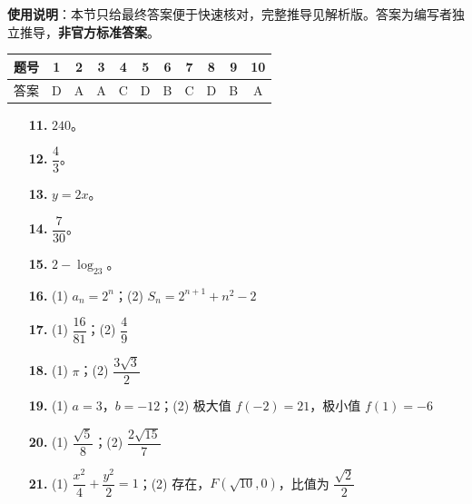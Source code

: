 
\begin{gknotice}
\textbf{使用说明}：本节只给最终答案便于快速核对，完整推导见解析版。答案为编写者独立推导，\textbf{非官方标准答案}。
\end{gknotice}

\begin{center}\begin{tabular}{ccccccccccc}
\toprule
题号 & 1 & 2 & 3 & 4 & 5 & 6 & 7 & 8 & 9 & 10 \\
\midrule
答案 & D & A & A & C & D & B & C & D & B & A \\
\bottomrule
\end{tabular}\end{center}

\begin{itemize}[leftmargin=2.6em]
  \item[\textbf{11.}] $240$。
  \item[\textbf{12.}] $\dfrac43$。
  \item[\textbf{13.}] $y=2x$。
  \item[\textbf{14.}] $\dfrac7{30}$。
  \item[\textbf{15.}] $2-\log_23$。
\end{itemize}

\begin{itemize}[leftmargin=2.6em]
  \item[\textbf{16.}] (1) $a_n=2^n$；(2) $S_n=2^{n+1}+n^2-2$
  \item[\textbf{17.}] (1) $\dfrac{16}{81}$；(2) $\dfrac49$
  \item[\textbf{18.}] (1) $\pi$；(2) $\dfrac{3\sqrt3}2$
  \item[\textbf{19.}] (1) $a=3$，$b=-12$；(2) 极大值 $f(-2)=21$，极小值 $f(1)=-6$
  \item[\textbf{20.}] (1) $\dfrac{\sqrt5}8$；(2) $\dfrac{2\sqrt{15}}7$
  \item[\textbf{21.}] (1) $\dfrac{x^2}4+\dfrac{y^2}2=1$；(2) 存在，$F(\sqrt{10},0)$，比值为 $\dfrac{\sqrt2}2$
\end{itemize}
